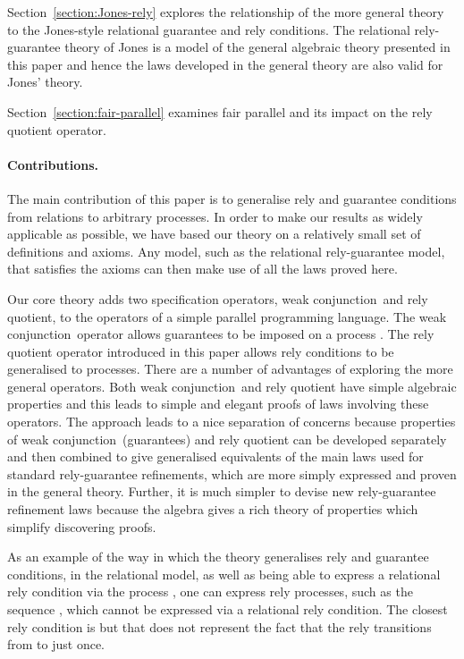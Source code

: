 \documentclass[fleqn]{fac}
\newcommand{\strictconjunction}{weak conjunction}
\begin{document}
Section~\ref{section:Jones-rely} explores the relationship 
of the more general theory to the Jones-style relational guarantee and rely conditions.
The relational rely-guarantee theory of Jones \cite{jones96a}
is a model of the general algebraic theory presented in this paper
and hence the laws developed in the general theory are also valid for Jones' theory.


Section~\ref{section:fair-parallel} examines fair parallel and its impact on the rely quotient operator.

\paragraph{Contributions.}

The main contribution of this paper is to generalise rely and guarantee conditions from relations to
arbitrary processes.
In order to make our results as widely applicable as possible,
we have based our theory on a relatively small set of definitions and axioms.
Any model, such as the relational rely-guarantee model, that satisfies the axioms
can then make use of all the laws proved here.

Our core theory adds two specification operators, \strictconjunction\ and rely quotient,
to the operators of a simple parallel programming language.
The \strictconjunction\ operator allows guarantees to be imposed on a process \cite{HayesJonesColvin14TR}.
The rely quotient operator introduced in this paper allows rely conditions to be generalised to processes.
There are a number of advantages of exploring the more general operators.
Both \strictconjunction\ and rely quotient have simple algebraic properties
and this leads to simple and elegant proofs of laws involving these operators.
The approach leads to a nice separation of concerns 
because properties of \strictconjunction\ (guarantees) and rely quotient can
be developed separately
and then combined to give 
generalised equivalents of the main laws used for standard rely-guarantee refinements, 
which are more simply expressed and proven in the general theory.
Further, it is much simpler to devise new rely-guarantee refinement laws 
because the algebra gives a rich theory of properties which simplify discovering proofs.

As an example of the way in which the theory generalises rely and guarantee conditions,
in the relational model, as well as being able to express 
a relational rely condition via the process ,
one can express rely processes, such as the sequence ,
which cannot be expressed via a relational rely condition.
The closest rely condition is 
but that does not represent the fact that the rely transitions from  to  just once.
\end{document}
